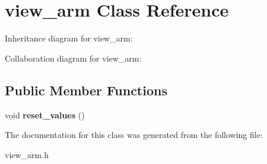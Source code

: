 \hypertarget{classview__arm}{}\section{view\+\_\+arm Class Reference}
\label{classview__arm}


Inheritance diagram for view\+\_\+arm\+:


Collaboration diagram for view\+\_\+arm\+:
\subsection*{Public Member Functions}
\begin{DoxyCompactItemize}
\item 
void {\bfseries reset\+\_\+values} ()\hypertarget{classview__arm_a123f6e7d76d9a434d9031ec67c1908ed}{}\label{classview__arm_a123f6e7d76d9a434d9031ec67c1908ed}

\end{DoxyCompactItemize}


The documentation for this class was generated from the following file\+:\begin{DoxyCompactItemize}
\item 
view\+\_\+arm.\+h\end{DoxyCompactItemize}
